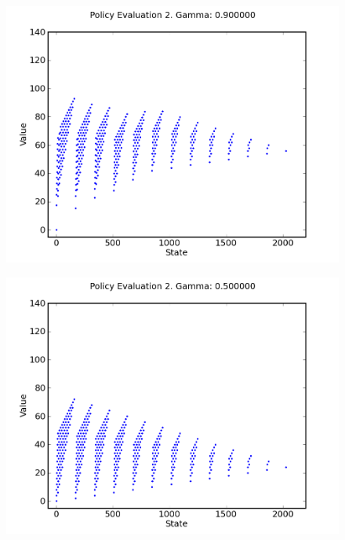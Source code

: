 \documentclass[a4paper]{article}
\begin{document}
\begin{figure}[h]
\center
\includegraphics[scale=0.75]{gamma_iteration/gamma_9_2.png}
\end{figure}

\begin{figure}[h]
\center
\includegraphics[scale=0.75]{gamma_iteration/gamma_5_2.png}
\end{figure}
\end{document}
